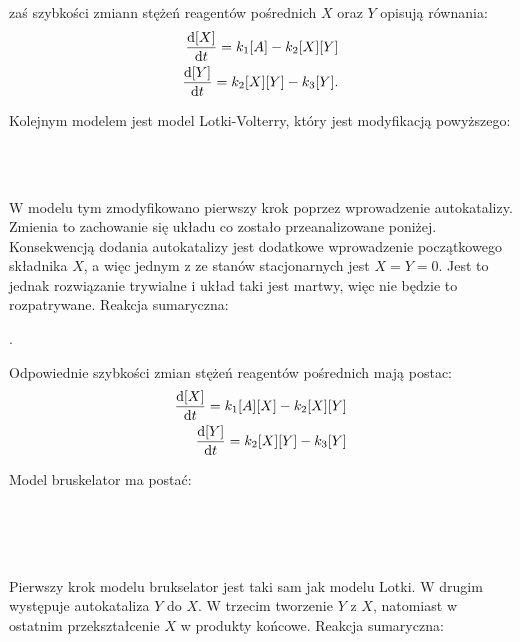 \documentclass[10pt, a4paper, twoside, onecolumn]{article}
\numberwithin{equation}{section}
\begin{document}
	zaś szybkości zmiann stężeń reagentów pośrednich $X$ oraz $Y$ opisują równania: 
	\begin{equation}
	\begin{split}
		\dv{[X]}{t}=k_{1}[A]-k_{2}[X][Y] \\
		\dv{[Y]}{t}=k_{2}[X][Y]-k_{3}[Y].
	\end{split}
	\end{equation}\par
	Kolejnym modelem jest model Lotki-Volterry, który jest modyfikacją powyższego:
	\begin{center}
		 \\
		 \\
	\end{center}
	W modelu tym zmodyfikowano pierwszy krok poprzez wprowadzenie autokatalizy. Zmienia to zachowanie się układu co zostało przeanalizowane poniżej. Konsekwencją dodania autokatalizy jest dodatkowe wprowadzenie początkowego składnika \(X\), a więc jednym z ze stanów stacjonarnych jest \(X=Y=0\). Jest to jednak rozwiązanie trywialne i układ taki jest martwy, więc nie będzie to rozpatrywane. Reakcja sumaryczna:
	\begin{center}
		.
	\end{center}
	Odpowiednie szybkości zmian stężeń reagentów pośrednich mają postac:
	\begin{equation}
	\begin{split}
		\dv{[X]}{t}=k_{1}[A][X]-k_{2}[X][Y] \\
		\dv{[Y]}{t}=k_{2}[X][Y]-k_{3}[Y]
	\end{split}
	\end{equation}\par
	Model bruskelator ma postać:
	\begin{center}
		 \\
		 \\
		 \\
	\end{center}
	Pierwszy krok modelu brukselator jest taki sam jak modelu Lotki. W drugim występuje autokataliza \(Y\) do \(X\). W trzecim tworzenie \(Y\) z \(X\), natomiast w ostatnim przekształcenie \(X\) w produkty końcowe. Reakcja sumaryczna: 
\end{document}
